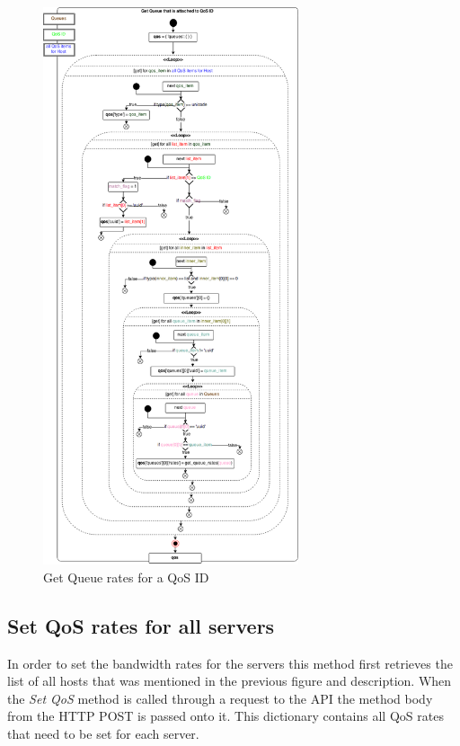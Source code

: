 \begin{figure}[H]
\centering

\includegraphics[width=0.67\textwidth]{images/implementation/cma_get_queue_rates_for_qos}

\caption{Get Queue rates for a QoS ID}
\end{figure}


\subsection{Set QoS rates for all servers}

In order to set the bandwidth rates for the servers this method first retrieves the list of all hosts that was mentioned in the previous figure and description. When the \textit{Set QoS} method is called through a request to the API the method body from the HTTP POST is passed onto it. This dictionary contains all QoS rates that need to be set for each server. 


